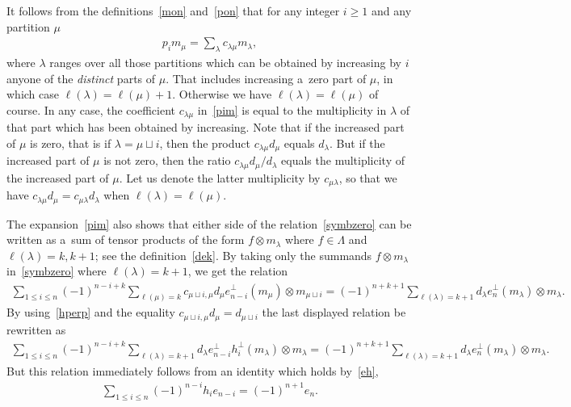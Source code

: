 \documentclass[pdftex]{sigma}
\numberwithin{equation}{section}
\renewcommand\ge{\geqslant}
\renewcommand\le{\leqslant}
\begin{document}
It follows from the def\/initions~\eqref{mon} and~\eqref{pon} that for any integer $i\ge1$ and any
partition $\mu$
\begin{gather}\label{pim}
p_im_\mu=\sum_\lambda c_{\lambda\mu}m_\lambda,
\end{gather}
where $\lambda$ ranges over all those partitions which can be obtained by increasing by $i$ anyone of the
\emph{distinct} parts of $\mu$.
That includes increasing a~zero part of $\mu$, in which case $\ell(\lambda)=\ell(\mu)+1$.
Otherwise we have $\ell(\lambda)=\ell(\mu)$ of course.
In any case, the coef\/f\/icient $c_{\lambda\mu}$ in~\eqref{pim} is equal to the
multiplicity in $\lambda$ of that part which has been obtained by increasing.
Note that if the increased part of $\mu$ is zero, that is if $\lambda=\mu\sqcup i$, then
the product $c_{\lambda\mu}d_\mu$ equals $d_\lambda$.
But if the increased part of $\mu$ is not zero, then the ratio $
c_{\lambda\mu}d_\mu/ d_\lambda $ equals the multiplicity of
the increased part of $\mu$.
Let us denote the latter multiplicity by $c_{\mu\lambda}$, so that we have
$c_{\lambda\mu}d_\mu=c_{\mu\lambda}d_\lambda$ when
$\ell(\lambda)=\ell(\mu)$.

The expansion~\eqref{pim} also shows that either side of the relation~\eqref{symbzero} can be written as
a~sum of tensor products of the form $f\otimes m_\lambda$ where $f\in\Lambda$ and $\ell(\lambda)=k,k+1$;
see the def\/inition~\eqref{dek}.
By taking only the summands $f\otimes m_\lambda$ in~\eqref{symbzero} where
$\ell(\lambda)=k+1$, we get the relation
\begin{gather*}
\sum_{1\le i\le n}(-1)^{n-i+k}\sum_{\ell(\mu)=k}c_{\mu
\sqcup i,\mu}d_\mu e_{n-i}^{\perp}(m_\mu)\otimes m_{\mu\sqcup i}
=(-1)^{n+k+1}\sum_{\ell(\lambda)=k+1}d_\lambda e_n^{\perp}(m_\lambda)\otimes m_\lambda.
\end{gather*}
By using~\eqref{hperp} and the equality $ c_{\mu\sqcup
i,\mu}d_\mu=d_{\mu\sqcup i}
$ the last displayed relation be rewritten as
\begin{gather*}
\sum_{1\le i\le n}(-1)^{n-i+k}\sum_{\ell(\lambda)=k+1}d_\lambda e_{n-i}
^{\perp}h_i^{\perp}(
m_\lambda)\otimes m_\lambda=(-1)^{n+k+1}\sum_{\ell(\lambda)=k+1}
d_\lambda e_n^{\perp}(m_\lambda)\otimes m_\lambda.
\end{gather*}
But this relation immediately follows from an identity which holds by~\eqref{eh},
\begin{gather*}
\sum_{1\le i\le n}(-1)^{n-i}h_ie_{n-i}=(-1)^{n+1}e_n.
\end{gather*}
\end{document}
